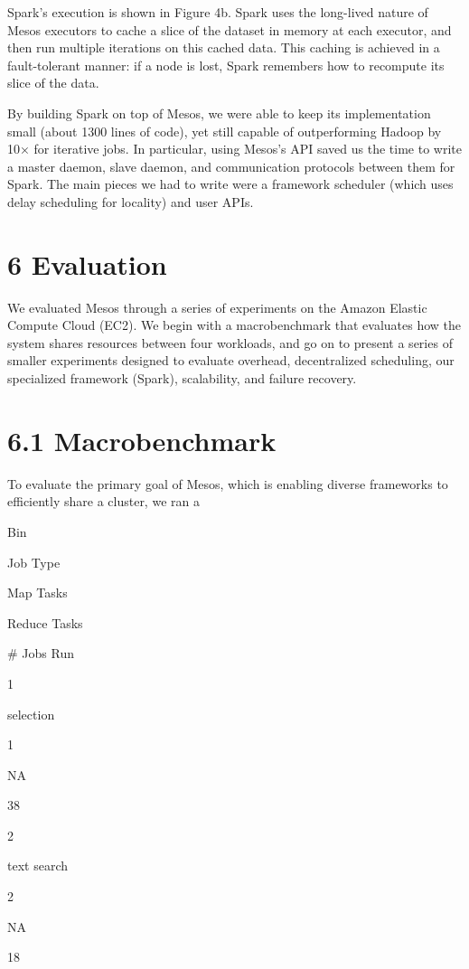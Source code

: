 \documentclass[
]{article}
\begin{document}
Spark's execution is shown in Figure 4b. Spark uses the long-lived
nature of Mesos executors to cache a slice of the dataset in memory at
each executor, and then run multiple iterations on this cached data.
This caching is achieved in a fault-tolerant manner: if a node is lost,
Spark remembers how to recompute its slice of the data.

By building Spark on top of Mesos, we were able to keep its
implementation small (about 1300 lines of code), yet still capable of
outperforming Hadoop by 10× for iterative jobs. In particular, using
Mesos's API saved us the time to write a master daemon, slave daemon,
and communication protocols between them for Spark. The main pieces we
had to write were a framework scheduler (which uses delay scheduling for
locality) and user APIs.

\section{6 Evaluation}\label{evaluation}

We evaluated Mesos through a series of experiments on the Amazon Elastic
Compute Cloud (EC2). We begin with a macrobenchmark that evaluates how
the system shares resources between four workloads, and go on to present
a series of smaller experiments designed to evaluate overhead,
decentralized scheduling, our specialized framework (Spark),
scalability, and failure recovery.

\section{6.1 Macrobenchmark}\label{macrobenchmark}

To evaluate the primary goal of Mesos, which is enabling diverse
frameworks to efficiently share a cluster, we ran a

Bin

Job Type

Map Tasks

Reduce Tasks

\# Jobs Run

1

selection

1

NA

38

2

text search

2

NA

18
\end{document}
